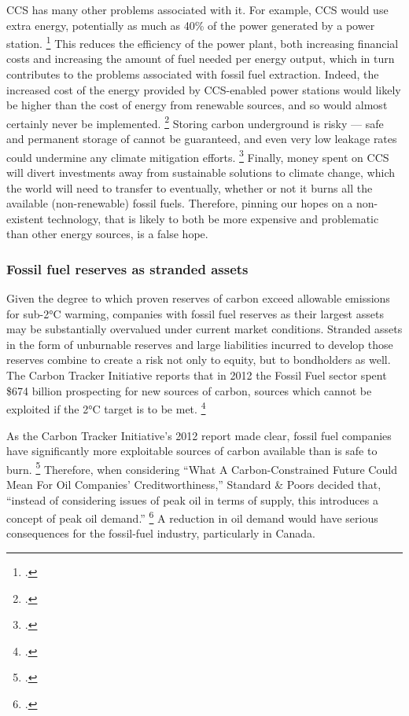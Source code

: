 CCS has many other problems associated with it. For example, CCS would use extra energy, potentially as much as 40\% of the power generated by a power station. \footcite{GPCCS}
This reduces the efficiency of the power plant, both increasing financial costs and increasing the amount of fuel needed per energy output, which in turn contributes to the problems associated with fossil fuel extraction.
Indeed, the increased cost of the energy provided by CCS-enabled power stations would likely be higher than the cost of energy from renewable sources, and so would almost certainly never be implemented. \footcite{SmartPlanetCCS}
Storing carbon underground is risky --- safe and permanent storage of  cannot be guaranteed, and even very low leakage rates could undermine any climate mitigation efforts. \footcite{GPCCS}
Finally, money spent on CCS will divert investments away from sustainable solutions to climate change, which the world will need to transfer to eventually, whether or not it burns all the available (non-renewable) fossil fuels.
Therefore, pinning our hopes on a non-existent technology, that is likely to both be more expensive and problematic than other energy sources, is a false hope.



	\subsubsection {Fossil fuel reserves as stranded assets} 



Given the degree to which proven reserves of carbon exceed allowable emissions for sub-2°C warming, companies with fossil fuel reserves as their largest assets may be substantially overvalued under current market conditions. 
Stranded assets in the form of unburnable reserves and large liabilities incurred to develop those reserves combine to create a risk not only to equity, but to bondholders as well.
The Carbon Tracker Initiative reports that in 2012 the Fossil Fuel sector spent \$674 billion prospecting for new sources of carbon, sources which cannot be exploited if the 2°C target is to be met. \footcite{CTI2013}



As the Carbon Tracker Initiative's 2012 report made clear, fossil fuel companies have significantly more exploitable sources of carbon available than is safe to burn. \footcite{CTI2012}
Therefore, when considering ``What A Carbon-Constrained Future Could Mean For Oil Companies' Creditworthiness,'' Standard \& Poors decided that, ``instead of considering issues of peak oil in terms of supply, this introduces a concept of peak oil demand.'' \footcite{SandPConstrained}
A reduction in oil demand would have serious consequences for the fossil-fuel industry, particularly in Canada.



